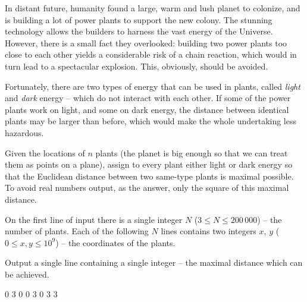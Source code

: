 





In distant future, humanity found a large, warm and lush planet to colonize, and is building a lot of power plants to support the new colony. The stunning technology allows the builders to harness the vast energy of the Universe. However, there is a small fact they overlooked: building two power plants too close to each other yields a considerable risk of a chain reaction, which would in turn lead to a spectacular explosion. This, obviously, should be avoided.

Fortunately, there are two types of energy that can be used in plants, called \textit{light} and \textit{dark} energy -- which do not interact with each other. If some of the power plants work on light, and some on dark energy, the distance between identical plants may be larger than before, which would make the whole undertaking less hazardous.




Given the locations of $n$ plants (the planet is big enough so that we can treat them as points on a plane), assign to every plant either light or dark energy so that the Euclidean distance between two same-type plants is maximal possible. To avoid real numbers output, as the answer, only the square of this maximal distance.


On the first line of input there is a single integer $N$ ($3 \leq N \leq 200\,000$) -- the number of plants.
Each of the following $N$ lines contains two integers $x$, $y$ ($0 \leq x, y \leq 10^9$) -- the coordinates of the plants.


Output a single line containing a single integer -- the maximal distance which can be achieved.



0 3
0 0
3 0
3 3
\sampleCOMMENT
\sampleEND




